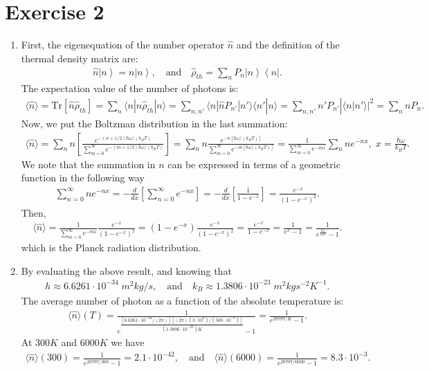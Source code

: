 \documentclass[letterpaper,11pt,twoside]{article}
\newcommand{\hn}{\hat{n}}
\newcommand{\hrho}{\hat{\rho}}
\newcommand{\Tr}[1]{\text{Tr}\left[#1\right]}
\newcommand{\ket}[1]{\left|#1\right\rangle}
\newcommand{\bra}[1]{\left\langle#1\right|}
\newcommand{\braket}[1]{\langle#1\rangle}
\begin{document}
\section*{Exercise 2}
\begin{enumerate}[itemsep=0pt,topsep=0pt,parsep=0pt,label=\alph*)]
  \item First, the eigenequation of the number operator $\hn$ and the definition of the thermal density matrix are:
  \begin{align*}
    \hn\ket{n}=n\ket{n},\quad\text{and}\quad\hrho_{th}=\sum_nP_n\ket{n}\bra{n}.
  \end{align*}
  The expectation value of the number of photons is:
  \begin{align*}
    \braket{\hn}=\Tr{\hn\hrho_{th}}=\sum_n \braket{n|\hn\hrho_{th}|n}=\sum_{n,n'}\braket{n|\hn P_{n'}|n'}\braket{n'|n}=\sum_{n,n'}n'P_{n'}|\braket{n|n'}|^2=\sum_nnP_n.
  \end{align*}
  Now, we put the Boltzman distribution in the last summation:
  \begin{align*}
    \braket{\hn}=\sum_nn\left[\frac{e^{-(n+1/2)\hbar\omega/(k_BT)}}{\sum_{m=0}^\infty e^{-(m+1/2)\hbar\omega/(k_BT)}}\right]=\sum_nn\frac{e^{-n[\hbar\omega/(k_BT)]}}{\sum_{m=0}^\infty e^{-m[\hbar\omega/(k_BT)]}}=\frac{1}{\sum_{m=0}^\infty e^{-mx}}\sum_nne^{-nx},\;x=\frac{\hbar\omega}{k_BT}.
  \end{align*}
  We note that the summation in $n$ can be expressed in terms of a geometric function in the following way
  \begin{align*}
    \sum_{n=0}^\infty ne^{-nx}=-\frac{d}{dx}\left[\sum_{n=0}^\infty e^{-nx}\right]=-\frac{d}{dx}\left[\frac{1}{1-e^{-x}}\right]=\frac{e^{-x}}{(1-e^{-x})^2}.
  \end{align*}
  Then,
  \begin{align*}
    \braket{\hn}=\frac{1}{\sum_{m=0}^\infty e^{-mx}}\frac{e^{-x}}{(1-e^{-x})^2}=(1-e^{-x})\frac{e^{-x}}{(1-e^{-x})^2}=\frac{e^{-x}}{1-e^{-x}}=\frac{1}{e^{x}-1}=\frac{1}{e^{\frac{\hbar\omega}{k_BT}}-1}.
  \end{align*}
  which is the Planck radiation distribution.
  \item By evaluating the above result, and knowing that 
  \begin{align*}
    h\approx6.6261\cdot10^{-34}\;m^2kg/s,\quad\text{and}\quad k_B\approx1.3806\cdot10^{-23}\;m^2kgs^{-2}K^{-1}.
  \end{align*}
  The average number of photon as a function of the absolute temperature is:
  \begin{align*}
    \braket{\hn}(T)=\frac{1}{e^{\dfrac{[6.6261\cdot10^{-34}/(2\pi)][(2\pi)(3\cdot10^8)/(500\cdot10^{-9})]}{(1.3806\cdot10^{-23})K}}-1}=\frac{1}{e^{28797/K}-1}.
  \end{align*}
  At $300K$ and $6000K$ we have 
  \begin{align*}
    \braket{\hn}(300)=\frac{1}{e^{28797/300}-1}=2.1\cdot10^{-42},\quad\text{and}\quad\braket{\hn}(6000)=\frac{1}{e^{28797/6000}-1}=8.3\cdot10^{-3}.
  \end{align*}
\end{enumerate}

%
\end{document}
